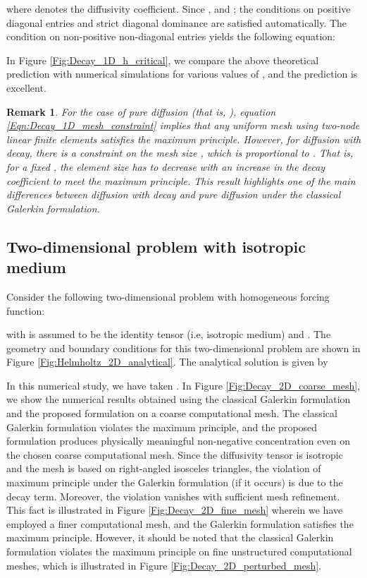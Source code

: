 \documentclass[11pt]{amsart}
\newtheorem{remark}[theorem]{Remark}
\begin{document}
where  denotes the diffusivity coefficient. Since ,  and 
; the conditions on positive diagonal entries and strict diagonal dominance 
are satisfied automatically. The condition on non-positive non-diagonal entries 
yields the following equation:

In Figure \ref{Fig:Decay_1D_h_critical}, we compare the above theoretical prediction with 
numerical simulations for various values of , and the prediction is excellent.

\begin{remark}
  For the case of pure diffusion (that is, ), equation \eqref{Eqn:Decay_1D_mesh_constraint} 
  implies that any uniform mesh using two-node linear finite elements satisfies the maximum principle. 
  However, for diffusion with decay, there is a constraint on the mesh size , which is proportional to 
  . That is, for a fixed , the element size has to decrease with an increase in the decay 
  coefficient to meet the maximum principle. This result highlights one of the main differences between 
  diffusion with decay and pure diffusion under the classical Galerkin formulation.
\end{remark}

\subsection{Two-dimensional problem with isotropic medium}
Consider the following two-dimensional problem with homogeneous forcing function:

with  is assumed to be the identity tensor (i.e, isotropic medium) and . The geometry and boundary conditions for this two-dimensional problem are shown in 
Figure \ref{Fig:Helmholtz_2D_analytical}. The analytical solution is given by

In this numerical study, we have taken . In Figure \ref{Fig:Decay_2D_coarse_mesh}, 
we show the numerical results obtained using the classical Galerkin formulation and the proposed 
formulation on a coarse computational mesh. The classical Galerkin formulation violates the maximum 
principle, and the proposed formulation produces physically meaningful non-negative concentration 
even on the chosen coarse computational mesh. 
Since the diffusivity tensor is isotropic and the mesh is based on right-angled isosceles 
triangles, the violation of maximum principle under the Galerkin formulation (if it occurs) 
is due to the decay term. Moreover, the violation vanishes with sufficient mesh refinement. 
This fact is illustrated in Figure \ref{Fig:Decay_2D_fine_mesh} wherein we have employed 
a finer computational mesh, and the Galerkin formulation satisfies the maximum principle. 
However, it should be noted that the classical Galerkin formulation violates the maximum 
principle on fine unstructured computational meshes, which is illustrated in Figure 
\ref{Fig:Decay_2D_perturbed_mesh}. 
\end{document}
